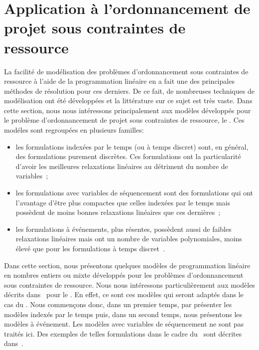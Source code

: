 \section[Application au RCPSP]{Application à l'ordonnancement de projet sous contraintes de
  ressource}   
\label{sec:PLNE_ordo_res}

La facilité de modélisation des problèmes d'ordonnancement sous
contraintes de ressource à l'aide de la programmation linéaire en a
fait une des principales méthodes de résolution pour ces
derniers. De ce fait, de nombreuses techniques de modélisation ont été
développées et la littérature sur ce sujet est très vaste. Dans cette
section, nous nous intéressons principalement aux modèles développés
pour le problème d'ordonnancement de projet sous contraintes de
ressource, le \RCPSP. Ces modéles sont regroupées en plusieurs
familles: 
\begin{itemize}
\item les formulations indexées par le temps (ou à temps discret)
sont, en général, des formulations purement discrètes. Ces
formulations ont la particularité d'avoir les meilleures relaxations
linéaires au détriment du nombre de
variables~\cite{CAVT,ex_RCPSP_discret};
\item les formulations avec variables de séquencement sont des
formulations qui ont l'avantage d'être plus compactes que celles
indexées par le temps mais possèdent de moins bonnes relaxations
linéaires que ces dernières~\cite{AVT,AMR};
\item les formulations à événements, plus résentes, possèdent aussi de
faibles relaxations linéaires mais ont un nombre de variables
polynomiales, moins élevé que pour les formulations à temps
discret~\cite{modele_RCPSP}.
\end{itemize}

Dans cette section, nous présentons quelques modèles de
programmation linéaire en nombres entiers ou mixte développés pour les
problèmes d'ordonnancement sous contraintes de ressource. Nous nous
intéressons particulièrement aux modèles décrits
dans~\cite{modele_RCPSP} pour le \RCPSP. En effet, ce sont ces modèles
qui seront adaptés dans le cas du \CECSP. Nous commençons donc, dans
un premier temps, par présenter les modèles indexés par le temps puis,
dans un second temps, nous présentons les modèles à événement. Les
modèles avec variables de séquencement ne sont pas traités ici. Des
exemples de telles formulations dans le cadre du \RCPSP~sont décrites
dans~\cite{ADN}.

